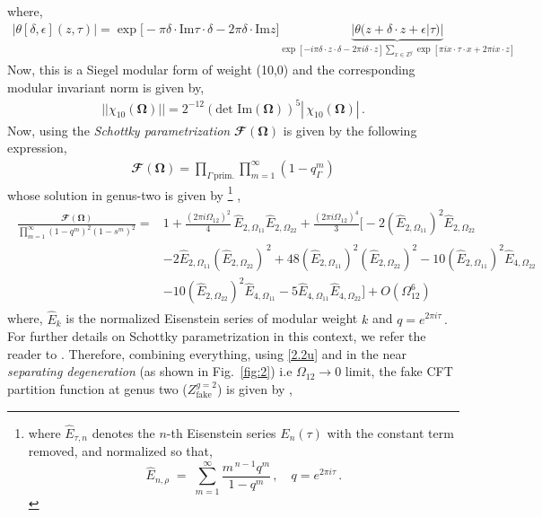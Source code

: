 \documentclass[12 pt]{article}
\begin{document}
where, \begin{align}
    |\theta[\delta,\epsilon](z,\tau)|=\exp\bigg[-\pi \delta\cdot \text{Im}\tau\cdot \delta-2\pi \delta\cdot \text{Im} z\bigg]\underbrace{|\theta(z+\delta\cdot z+\epsilon|\tau)|}_{\exp[-i\pi \delta\cdot z\cdot\delta-2\pi i \delta\cdot z]\sum_{x\in \mathbb{Z}^g}\exp[\pi i x\cdot\tau\cdot x+2\pi i x\cdot z]}
\end{align}
Now, this is a Siegel modular form of weight (10,0) and the corresponding modular invariant norm is given by,
\begin{align}
    ||\chi_{10}(\mathbf{\Omega})||=2^{-12}(\textrm{det Im}(\mathbf{\Omega}))^5|\,\chi_{10}(\mathbf{\Omega})|\,.
\end{align}
Now, using the \textit{Schottky parametrization} $\mathbfcal{F}(\mathbf \Omega)$ is given by the following expression,
\begin{align}
    \mathbfcal{F}(\mathbf\Omega)=\prod_{\Gamma \,\textrm{prim}.}\prod_{m=1}^{\infty}(1-q^{m}_{\Gamma})
    \end{align}
whose solution in genus-two is given by \cite{Yin:2007gv} \footnote{where $\hat{E}_{\tau,n}$ denotes the $n$-th Eisenstein series $E_n(\tau)$ with the constant term removed,
and normalized so that,
\[
\hat{E}_{n,\rho} \;=\; \sum_{m=1}^\infty \frac{m^{\,n-1} q^m}{1 - q^m}\,, \quad q=e^{2\pi i\tau}\,.
\]
} ,
\begin{align}
\begin{split}
\frac{\mathbfcal{F}(\mathbf{\Omega})}{\prod_{m=1}^\infty (1 - q^m)^2 (1 - s^m)^2}
= &1
+ \frac{(2\pi i \Omega_{12})^2}{4} \, \hat{E}_{2,\Omega_{11}} \hat{E}_{2,\Omega_{22}}
+ \frac{(2\pi i \Omega_{12})^4}{3} \Big[
 -2 (\hat{E}_{2,\Omega_{11}})^2 \hat{E}_{2,\Omega_{22}}\\&
 -2\hat{E}_{2,\Omega_{11}} (\hat{E}_{2,\Omega_{22}})^{\,2}
 +48 (\hat{E}_{2,\Omega_{11}})^2 (\hat{E}_{2,\Omega_{22}})^2
 -10 (\hat{E}_{2,\Omega_{11}})^2 \hat{E}_{4,\Omega_{22}}\\&
 -10 (\hat{E}_{2,\Omega_{22}})^2 \hat{E}_{4,\Omega_{11}}
 -5 \hat{E}_{4,\Omega_{11}} \hat{E}_{4,\Omega_{22}}
\Big]+ O(\Omega_{12}^6)
\end{split}
\end{align}
where, $\hat{E}_k$ is the normalized Eisenstein series of modular weight $k$ and $q=e^{2\pi i\tau}\,.$
    For further details on Schottky parametrization in this context, we refer the reader to \cite{Yin:2007gv}. Therefore, combining everything, using \eqref{2.2u} and in the near \textit{separating degeneration} (as shown in Fig.~\ref{fig:2}) i.e $\Omega_{12}\rightarrow 0$ limit, the fake CFT partition function at genus two ($Z^{g=2}_{\text{fake}}$) is given by \cite{Yin:2007gv},
\end{document}
